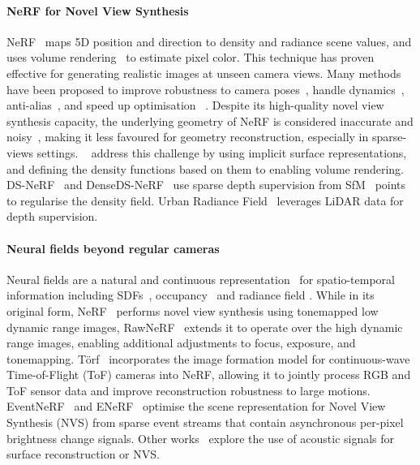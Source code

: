 \paragraph{NeRF for Novel View Synthesis}
NeRF~\cite{mildenhall2020nerf} maps 5D position and direction to density and radiance scene values, and uses volume rendering~\cite{max1995optical,max2005local} to estimate pixel color. This technique has proven effective for generating realistic images at unseen camera views. Many methods have been proposed to improve robustness to camera poses~\cite{lin2021barf,chng2022garf}, handle dynamics~\cite{ost2021neural,pumarola2021d}, anti-alias~\cite{zhang2020nerf++,barron2021mip,barron2022mip}, and speed up optimisation~\cite{liu2020neural,yu2021plenoxels,muller2022instant} \etc. Despite its high-quality novel view synthesis capacity, the underlying geometry of NeRF is considered inaccurate and noisy~\cite{oechsle2021unisurf}, making it less favoured for geometry reconstruction, especially in sparse-views settings. ~\cite{oechsle2021unisurf,yariv2021volume,wang2021neus} address this challenge by using implicit surface representations, and defining the density functions based on them to enabling volume rendering. DS-NeRF~\cite{deng2021depth} and DenseDS-NeRF~\cite{roessle2021dense} use sparse depth supervision from SfM~\cite{schoenberger2016sfm} points to regularise the density field. Urban Radiance Field~\cite{rematas2021urban} leverages LiDAR data for depth supervision. %

\paragraph{Neural fields beyond regular cameras}
Neural fields are a natural and continuous representation~\cite{xie2022neural} for spatio-temporal information including SDFs~\cite{park2019deepsdf}, occupancy~\cite{mescheder2019occupancy} and radiance field \cite{mildenhall2020nerf} \etc. 
While in its original form, NeRF~\cite{mildenhall2020nerf} performs novel view synthesis using tonemapped low dynamic range images, RawNeRF~\cite{mildenhall2022nerf} extends it to operate over the high dynamic range images, enabling additional adjustments to focus, exposure, and tonemapping. T{\"o}rf~\cite{attal2021torf} incorporates the image formation model for continuous-wave Time-of-Flight (ToF) cameras into NeRF, allowing it to jointly process RGB and ToF sensor data and improve reconstruction robustness to large motions. EventNeRF~\cite{rudnev2022eventnerf} and ENeRF~\cite{klenk2022nerf} optimise the scene representation for Novel View Synthesis (NVS) from sparse event streams that contain asynchronous per-pixel brightness change signals. Other works~\cite{qadri2022neural,luo2022learning} explore the use of acoustic signals for surface reconstruction or NVS. 